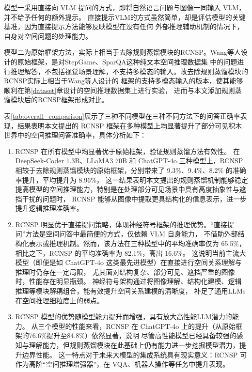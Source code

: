 模型一采用直接向 VLM 提问的方式，即将自然语言问题与图像一同输入 VLM，并不给予任何的额外提示。
直接提示VLM的方式虽然简单，却是评估模型的关键基准，因为直接提示方法能够反映模型在没有任何
外部推理辅助机制的情况下，自身对空间问题的处理能力。

模型二为原始框架方法，实际上相当于去除规则蒸馏模块的RCNSP。Wang等人设计的原始框架\cite{wang2024DSPy}，是对StepGame、SparQA这种纯文本空间推理数据集
中的问题进行推理解答，不包括视觉场景理解，不支持多模态的输入。故去除规则蒸馏模块的RCNSP实际上相当于Wang等人设计的
框架的支持多模态输入的版本，使其能够顺利在第\ref{dataset}章设计的空间推理数据集上进行实验，
进而与本文添加规则蒸馏模块后的RCNSP框架形成对比。

表\ref{tab:overall_comparison}展示了三种不同模型在三种不同方法下的问答正确率表现，结果表明本文提出的 RCNSP 框架在多种模型上均显著提升了部分可见积木世界中的空间推理问答准确率，具体分析如下：
\begin{enumerate}[nosep]
\item RCNSP 在所有模型中均显著优于原始框架，验证规则蒸馏方法有效性。
在 DeepSeek-Coder 1.3B、LLaMA3 70B 和 ChatGPT-4o 三种模型上，RCNSP 相较于去除规则蒸馏模块的原始框架，分别带来了 9.3\%、9.4\%、8.2\% 的准确率提升，平均提升为 8.96\%，
这一结果表明本文提出的规则蒸馏机制能够稳定提高模型的空间推理能力，特别是在处理部分可见场景中具有高度抽象性与遮挡干扰的问题时，
RCNSP 能够从图像中提取更具结构化的信息表示，进一步提升逻辑推理准确率。
\item RCNSP 明显优于直接提问策略，体现神经符号框架的推理优势。“直接提问”方法是空间问答中最简便的方式，仅依赖 VLM 自身能力，
不借助外部结构化表示或推理机制。然而，该方法在三种模型中的平均准确率仅为 65.5\%，相比之下，RCNSP 的平均准确率为 82.1\%，高出 16.6\%。
这说明当前主流大模型（即便是如 ChatGPT-4o 这类最先进模型）在直接进行空间关系理解与推理时仍存在一定局限，
尤其面对结构复杂、部分可见、遮挡严重的图像时，性能存在明显瓶颈。
神经符号架构通过将图像理解、结构化建模、逻辑推理等模块解耦组合，能有效提升空间关系建模的清晰度，
补足了通用LLMs在空间推理细粒度上的弱点。
\item RCNSP 模型的优势随模型能力提升而增强，具有放大高性能LLM潜力的能力。
从三个模型的性能来看，RCNSP 在 ChatGPT-4o 上的提升（从原始框架的76.6\%提升至84.8\%）依然显著，说明
尽管高性能模型已经具备较强的感知与理解能力，但规则蒸馏模块在此基础上仍有能力进一步挖掘模型潜力，提升边界性能。
这一特点对于未来大模型的集成系统具有现实意义：RCNSP 可作为高阶“空间推理增强器”，在 VQA、机器人操作等任务中提升表现。
\end{enumerate}
